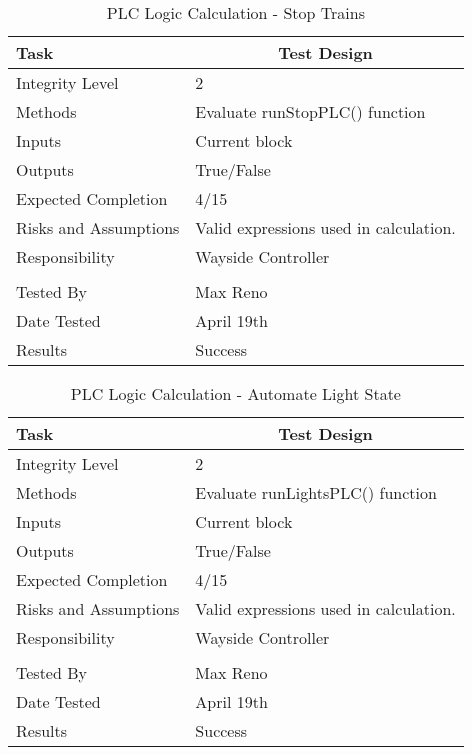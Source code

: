 \documentclass[]{article}
\begin{document}
\begin{table}[H]
	\centering
	\caption{PLC Logic Calculation - Stop Trains}
	\begin{tabular}{|l|l|}
		\hline
		Task & \multicolumn{1}{c|}{Test Design} \\ \hline
		Integrity Level & 2 \\ \hline
		Methods & Evaluate runStopPLC() function\\ \hline
		Inputs &  Current block \\ \hline
		Outputs &  True/False \\ \hline
		Expected Completion & 4/15\\ \hline
		Risks and Assumptions & \parbox[t]{10cm}{Valid expressions used in calculation.} \\ \hline
		Responsibility & Wayside Controller\\ \hline
		\\ \hline
		Tested By   &  Max Reno\\	\hline
		Date Tested & \parbox[t]{10cm}{April 19th}\\ \hline
		Results & Success\\ \hline
	\end{tabular}
\end{table}

\begin{table}[H]
	\centering
	\caption{PLC Logic Calculation - Automate Light State}
	\begin{tabular}{|l|l|}
		\hline
		Task & \multicolumn{1}{c|}{Test Design} \\ \hline
		Integrity Level & 2 \\ \hline
		Methods & Evaluate runLightsPLC() function\\ \hline
		Inputs &  Current block \\ \hline
		Outputs &  True/False \\ \hline
		Expected Completion & 4/15\\ \hline
		Risks and Assumptions & \parbox[t]{10cm}{Valid expressions used in calculation.} \\ \hline
		Responsibility & Wayside Controller\\ \hline
		\\ \hline
		Tested By   &  Max Reno\\	\hline
		Date Tested & \parbox[t]{10cm}{April 19th}\\ \hline
		Results & Success\\ \hline
	\end{tabular}
\end{table}
\end{document}
